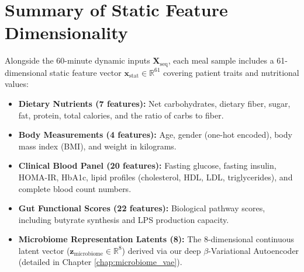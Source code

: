 \section{Summary of Static Feature Dimensionality}
Alongside the 60-minute dynamic inputs $\mathbf{X}_{\text{seq}}$, each meal sample includes a 61-dimensional static feature vector $\mathbf{x}_{\text{stat}} \in \mathbb{R}^{61}$ covering patient traits and nutritional values:
\begin{itemize}
    \item \textbf{Dietary Nutrients (7 features):} Net carbohydrates, dietary fiber, sugar, fat, protein, total calories, and the ratio of carbs to fiber.
    \item \textbf{Body Measurements (4 features):} Age, gender (one-hot encoded), body mass index (BMI), and weight in kilograms.
    \item \textbf{Clinical Blood Panel (20 features):} Fasting glucose, fasting insulin, HOMA-IR, HbA1c, lipid profiles (cholesterol, HDL, LDL, triglycerides), and complete blood count numbers.
    \item \textbf{Gut Functional Scores (22 features):} Biological pathway scores, including butyrate synthesis and LPS production capacity.
    \item \textbf{Microbiome Representation Latents (8):} The 8-dimensional continuous latent vector ($\mathbf{z}_{\text{microbiome}} \in \mathbb{R}^8$) derived via our deep $\beta$-Variational Autoencoder (detailed in Chapter \ref{chap:microbiome_vae}).
\end{itemize}

